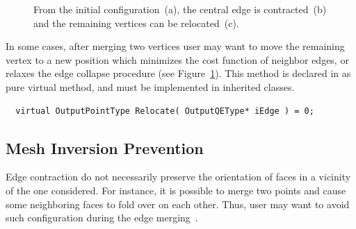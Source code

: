 \documentclass{InsightArticle}
\theoremstyle{plain}
\begin{document}
\begin{figure}[tb]
  \centering
  \caption{From the initial configuration~(a), the central edge is contracted~(b) and the remaining vertices can be relocated~(c).}
  \label{fig:merge_relocation}
\end{figure}

In some cases, after merging two vertices user may want to move the remaining vertex to a new position which minimizes the cost function of neighbor edges, or relaxes the edge collapse procedure (see Figure~\ref{fig:merge_relocation}). This method is declared in  as pure virtual method, and must be implemented in inherited classes.

\begin{verbatim}
  virtual OutputPointType Relocate( OutputQEType* iEdge ) = 0;
\end{verbatim}


\subsection{Mesh Inversion Prevention}
Edge contraction do not necessarily preserve the orientation of faces in a vicinity of the one considered. For instance, it is possible to merge two points and cause some neighboring faces to fold over on each other. Thus, user may want to avoid such configuration during the edge merging~\cite{Ronfard96}.
\end{document}
